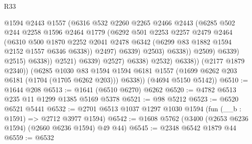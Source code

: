 \begin{lexlean}{R33}
\begin{coremodule}
                                      @1594
                                      @2443
                                      @1557
                                      (@6316
                                        @532
                                        @2260
                                        @2265
                                        @2466
                                        @2443
                                        (@6285
                                          @502
                                          @244
                                          @2258
                                          @1596
                                          @2464
                                          @1779
                                          (@6292
                                            @501
                                            @2253
                                            @2257
                                            @2479
                                            @2464
                                            (@6310
                                              @500
                                              @1870
                                              @2252
                                              @2041
                                              @2478
                                              @6342
                                              (@6299 @83 @1882 @1594 @2152 @1557 @6346 @6338))
                                            @2497)
                                          @6339)
                                        @2503)
                                      @6338))
                                  @2509)
                                @6339)
                              @2515)
                            @6338))
                        @2521)
                      @6339)
                    @2527)
                  @6338)
                @2532)
              @6338))
          (@2177 @1879 @2340))
        (@6285
          @1030
          @83
          @1594
          @1594
          @6181
          @1557
          (@1699 @6262 @203 @6181 (@1704 (@1705 @6262 @203)))
          @6338))
      (@4694 @5150 @5142))
@6510 := @1644 @208
@6513 := @1641 (@6510 @6270) @6262
@6520 := @4782 @6513 @235 @11 @1299 @1385 @5169 @5378
@6521 := @98 @5212
@6523 := @6520 @6521 @5441
@6532 := @2701 @6513 @1037 @1297 @1030 @1594 (fun (__b : @1591) => @2712 @3977 @1594)
@6542 := @1608 @5762 (@3400 (@2653 @6236 @1594) (@2660 @6236 @1594) @49 @44)
@6545 := @2348 @6542 @1879 @44
@6559 := @6532

\end{coremodule}
\end{lexlean}
